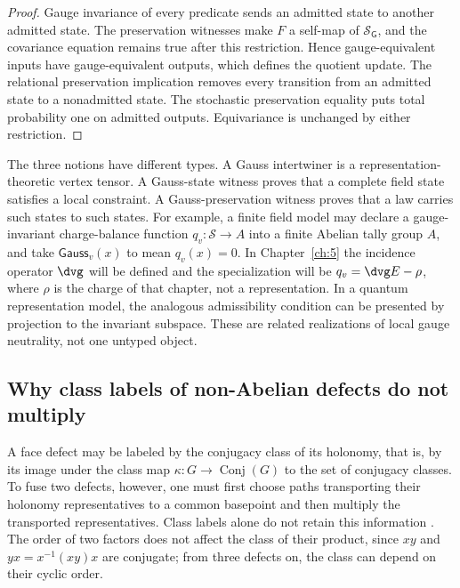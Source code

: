 \begin{proof}
Gauge invariance of every predicate sends an admitted state to another
admitted state.  The preservation witnesses make $F$ a self-map of
$\mathcal S_{\mathsf G}$, and the covariance equation remains true after this
restriction.  Hence gauge-equivalent inputs have gauge-equivalent outputs,
which defines the quotient update.  The relational preservation implication
removes every transition from an admitted state to a nonadmitted state.  The
stochastic preservation equality puts total probability one on admitted
outputs.  Equivariance is unchanged by either restriction.
\end{proof}

The three notions have different types.  A Gauss intertwiner is a
representation-theoretic vertex tensor.  A Gauss-state witness proves that a
complete field state satisfies a local constraint.  A Gauss-preservation
witness proves that a law carries such states to such states.  For example, a
finite field model may declare a gauge-invariant charge-balance function
$q_v:\mathcal S\to A$ into a finite Abelian tally group $A$, and take
$\mathsf{Gauss}_v(x)$ to mean $q_v(x)=0$.  In
Chapter~\ref{ch:5} the incidence operator $\dvg$ will be defined and the specialization
will be $q_v=\dvg E-\rho$, where $\rho$ is the charge of that chapter, not a
representation.  In a quantum representation model, the analogous
admissibility condition can be presented by projection to the invariant
subspace.  These are related realizations of local gauge neutrality, not one
untyped object.

\subsection{Why class labels of non-Abelian defects do not multiply}

A face defect may be labeled by the conjugacy class of its holonomy, that is,
by its image under the class map $\kappa:G\to\operatorname{Conj}(G)$ to the
set of conjugacy classes.  To fuse two defects, however, one must first choose
paths transporting their holonomy representatives to a common basepoint and
then multiply the transported representatives.  Class labels alone do not
retain this information \cite{PatternGeometry}.  The order of two factors does
not affect the class of their product, since $xy$ and $yx=x^{-1}(xy)x$ are
conjugate; from three defects on, the class can depend on their cyclic order.

